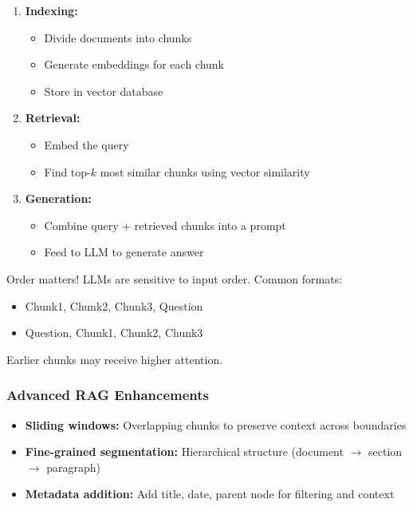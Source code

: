 \begin{thmbox}
\begin{enumerate}
  \item \textbf{Indexing:}
  \begin{itemize}
    \item Divide documents into chunks
    \item Generate embeddings for each chunk
    \item Store in vector database
  \end{itemize}
  
  \item \textbf{Retrieval:}
  \begin{itemize}
    \item Embed the query
    \item Find top-$k$ most similar chunks using vector similarity
  \end{itemize}
  
  \item \textbf{Generation:}
  \begin{itemize}
    \item Combine query + retrieved chunks into a prompt
    \item Feed to LLM to generate answer
  \end{itemize}
\end{enumerate}
\end{thmbox}

\begin{tipbox}
Order matters! LLMs are sensitive to input order. Common formats:
\begin{itemize}
  \item Chunk1, Chunk2, Chunk3, Question
  \item Question, Chunk1, Chunk2, Chunk3
\end{itemize}

Earlier chunks may receive higher attention.
\end{tipbox}

\bigseparator

\subsubsection{Advanced RAG Enhancements}

\begin{thmbox}
\begin{itemize}
  \item \textbf{Sliding windows:} Overlapping chunks to preserve context across boundaries
  \item \textbf{Fine-grained segmentation:} Hierarchical structure (document $\to$ section $\to$ paragraph)
  \item \textbf{Metadata addition:} Add title, date, parent node for filtering and context
\end{itemize}
\end{thmbox}

